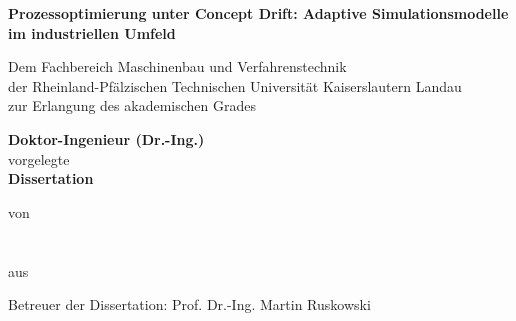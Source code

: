 
\begin{titlepage}

\begin{center}

 \vspace*{1cm}

 \textbf{\Huge Prozessoptimierung unter Concept Drift: Adaptive Simulationsmodelle im industriellen Umfeld}



 \vspace{2cm}

 Dem Fachbereich Maschinenbau und Verfahrenstechnik \\[6pt]
 der Rheinland-Pfälzischen Technischen Universität Kaiserslautern Landau\\[6pt]
 zur Erlangung des akademischen Grades\\[6pt]
 
 \vspace{1cm}
 
 \textbf{Doktor-Ingenieur (Dr.-Ing.)}\\[6pt]
 vorgelegte\\[6pt]

 \textbf{Dissertation}

 \vfill

 von \\[4pt]
 \Geschlecht \\[4pt]
 \textbf{\AkGrad~ \Name} \\[6pt]
 aus \Geburtsort

 \vfill

 \the\year

 \vspace{1cm}

 Betreuer der Dissertation: Prof. Dr.-Ing. Martin Ruskowski
 
 \vspace*{2cm}
\end{center}

\end{titlepage}
\pagestyle{empty}
\cleardoublepage
\pagestyle{headings}
